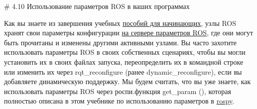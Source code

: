 # 4.10 Использование параметров ROS в ваших программах


Как вы знаете из завершения учебных \href{http://wiki.ros.org/ROS/Tutorials}{пособий для начинающих}, узлы ROS хранят свои параметры конфигурации \href{http://wiki.ros.org/ROS/Tutorials}{на сервере параметров ROS}, где они могут быть прочитаны и изменены другими активными узлами. Вы часто захотите использовать параметры ROS в своих собственных сценариях, чтобы вы могли установить их в своих файлах запуска, переопределить их в командной строке или изменить их через rqt\_reconfigure (ранее dynamic\_reconfigure), если вы добавляете динамическую поддержку. Мы будем считать, что вы уже знаете, как использовать параметры ROS через роспи.функция get\_param (), которая полностью описана в этом учебнике по использованию параметров в \href{http://wiki.ros.org/ROS/Tutorials}{rospy}.

